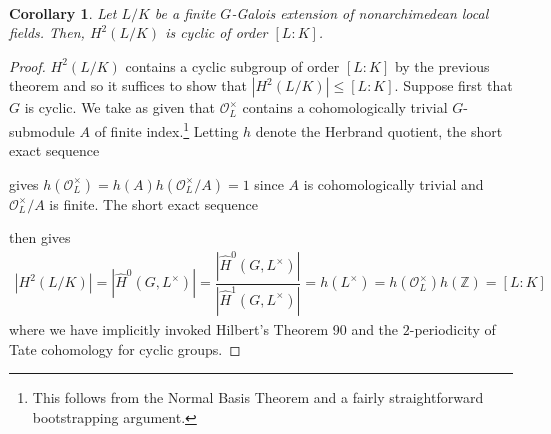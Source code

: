 \documentclass[11pt]{article}
\newcommand{\Z}{\mathbb{Z}}
\newcommand{\df}{\dfrac}
\newcommand{\mc}[1]{\mathcal{#1}}
\renewcommand{\O}{\mc{O}}
\newtheorem*{corollary*}{\\Corollary}
\begin{document}
\begin{corollary*}
Let $L/K$ be a finite $G$-Galois extension of nonarchimedean local fields. Then, $H^2(L/K)$ is cyclic of order $[L:K]$.
\end{corollary*}
\begin{proof}
$H^2(L/K)$ contains a cyclic subgroup of order $[L:K]$ by the previous theorem and so it suffices to show that $|H^2(L/K)|\leq[L:K]$. Suppose first that $G$ is cyclic. We take as given that $\O_L^{\times}$ contains a cohomologically trivial $G$-submodule $A$ of finite index.\footnote{This follows from the Normal Basis Theorem and a fairly straightforward bootstrapping argument.} Letting $h$ denote the Herbrand quotient, the short exact sequence
\begin{center}
\end{center}
gives $h(\O_L^{\times})=h(A)h(\O_L^{\times}/A)=1$ since $A$ is cohomologically trivial and $\O_L^{\times}/A$ is finite. The short exact sequence 
\begin{center}
\end{center}
then gives 
\begin{align*}
|H^2(L/K)|
=|\hat{H}^0(G,L^{\times})|
=\df{|\hat{H}^0(G,L^{\times})|}{|\hat{H}^1(G,L^{\times})|}
=h(L^{\times})
=h(\O_L^{\times})h(\Z)
=[L:K]
\end{align*}
where we have implicitly invoked Hilbert's Theorem 90 and the $2$-periodicity of Tate cohomology for cyclic groups.


\end{proof}
\end{document}
